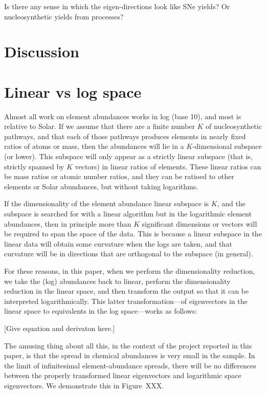 \documentclass[12pt]{article}
\begin{document}
Is there any sense in which the eigen-directions look like SNe yields?
Or nucleosynthetic yields from processes?

\section{Discussion}

\appendix
\section{Linear vs log space}

Almost all work on element abundances works in log (base 10), and most is
relative to Solar.
If we assume that there are a finite number $K$ of nucleosynthetic pathways,
and that each of those pathways produces elements in nearly fixed
ratios of atoms or mass, then the abundances will lie in a $K$-dimensional
subspace (or lower).
This subspace will only appear as a strictly linear subspace (that is, strictly
spanned by $K$ vectors) in linear ratios of elements.
These linear ratios can be mass ratios or atomic number ratios, and they can be ratioed
to other elements or Solar abundances, but without taking logarithms.

If the dimensionality of the element abundance linear subspace is $K$, and the
subspace is searched for with a linear algorithm but in the logarithmic element
abundances, then in principle more than $K$ significant dimensions or vectors
will be required to span the space of the data.
This is because a linear subspace in the linear data will obtain some curvature
when the logs are taken, and that curvature will be in directions that are orthogonal
to the subspace (in general).

For these reasons, in this paper, when we perform the dimensionality reduction,
we take the (log) abundances back to linear, perform the dimensionality reduction
in the linear space, and then transform the output so that it can be interpreted
logarithmically.
This latter transformation---of eigenvectors in the linear space to equivalents
in the log space---works as follows:

[Give equation and derivaton here.]

The amusing thing about all this, in the context of the project reported in this paper,
is that the spread in chemical abundances is very small in the sample.
In the limit of infinitesimal element-abundance spreads, there will be no differences
between the properly transformed linear eigenvectors and logarithmic space eigenvectors.
We demonstrate this in Figure~XXX.
\end{document}
